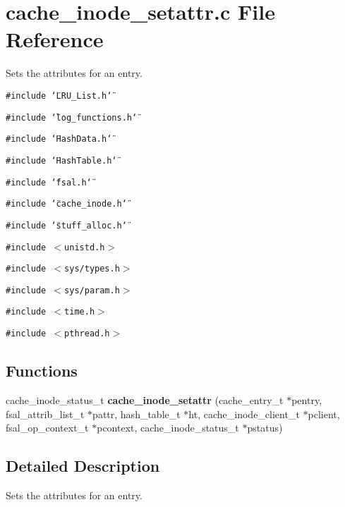 \section{cache\_\-inode\_\-setattr.c File Reference}
\label{cache__inode__setattr_8c}
Sets the attributes for an entry. 

{\tt \#include \char`\"{}LRU\_\-List.h\char`\"{}}\par
{\tt \#include \char`\"{}log\_\-functions.h\char`\"{}}\par
{\tt \#include \char`\"{}Hash\-Data.h\char`\"{}}\par
{\tt \#include \char`\"{}Hash\-Table.h\char`\"{}}\par
{\tt \#include \char`\"{}fsal.h\char`\"{}}\par
{\tt \#include \char`\"{}cache\_\-inode.h\char`\"{}}\par
{\tt \#include \char`\"{}stuff\_\-alloc.h\char`\"{}}\par
{\tt \#include $<$unistd.h$>$}\par
{\tt \#include $<$sys/types.h$>$}\par
{\tt \#include $<$sys/param.h$>$}\par
{\tt \#include $<$time.h$>$}\par
{\tt \#include $<$pthread.h$>$}\par
\subsection*{Functions}
\begin{CompactItemize}
\item 
cache\_\-inode\_\-status\_\-t {\bf cache\_\-inode\_\-setattr} (cache\_\-entry\_\-t $\ast$pentry, fsal\_\-attrib\_\-list\_\-t $\ast$pattr, hash\_\-table\_\-t $\ast$ht, cache\_\-inode\_\-client\_\-t $\ast$pclient, fsal\_\-op\_\-context\_\-t $\ast$pcontext, cache\_\-inode\_\-status\_\-t $\ast$pstatus)
\end{CompactItemize}


\subsection{Detailed Description}
Sets the attributes for an entry. 

